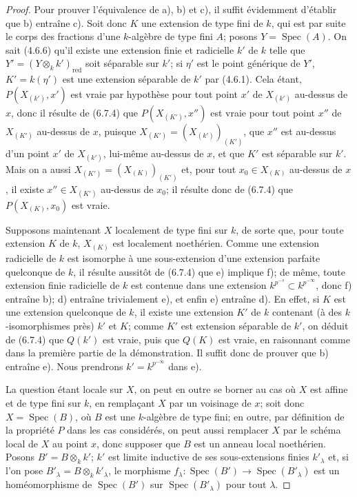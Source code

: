 \begin{proof}
Pour prouver l'équivalence de a), b) et c), il suffit évidemment d'établir
que b) entraîne c). Soit donc $K$ une extension de type fini de $k$, qui est
par suite le corps des fractions d'une $k$-algèbre de type fini $A$; posons
$Y=\operatorname{Spec}(A)$. On sait (4.6.6) qu'il existe une extension finie
et radicielle $k'$ de $k$ telle que $Y'=(Y\otimes_k k')_{\mathrm{red}}$ soit
séparable sur $k'$; si $\eta'$ est le point générique de $Y'$, $K'=k(\eta')$
est une extension séparable de $k'$ par (4.6.1). Cela étant,
$P(X_{(k')},x')$ est vraie par hypothèse pour tout point $x'$ de $X_{(k')}$
au-dessus de $x$, donc il résulte de (6.7.4) que $P(X_{(K')},x'')$ est vraie
pour tout point $x''$ de $X_{(K')}$ au-dessus de $x$, puisque
$X_{(K')}=(X_{(k')})_{(K')}$, que $x''$ est au-dessus d'un point $x'$ de
$X_{(k')}$, lui-même au-dessus de $x$, et que $K'$ est séparable sur $k'$.
Mais on a aussi
$X_{(K')}=(X_{(K)})_{(K')}$ et, pour tout $x_0\in X_{(K)}$ au-dessus de
$x$, il existe $x''\in X_{(K')}$ au-dessus de $x_0$; il résulte donc de
(6.7.4) que $P(X_{(K)},x_0)$ est vraie.

Supposons maintenant $X$ localement de type fini sur $k$, de sorte que, pour
toute extension $K$ de $k$, $X_{(K)}$ est localement noethérien. Comme une
extension radicielle de $k$ est isomorphe à une sous-extension d'une extension
parfaite quelconque de $k$, il résulte aussitôt de (6.7.4) que e) implique f);
de même, toute extension finie radicielle de $k$ est contenue dans une
extension $k^{p^{-s}}\subset k^{p^{-\infty}}$, donc f) entraîne b); d) entraîne
trivialement e), et enfin e) entraîne d). En effet, si $K$ est une extension
quelconque de $k$,
il existe une extension $K'$ de $k$ contenant (à des $k$-isomorphismes près)
$k'$ et $K$; comme $K'$ est extension séparable de $k'$, on déduit de (6.7.4)
que $Q(k')$ est vraie, puis que $Q(K)$ est vraie, en raisonnant comme dans la
première partie de la démonstration. Il suffit donc de prouver que b) entraîne
e). Nous prendrons $k'=k^{p^{-\infty}}$ dans e).

La question étant locale sur $X$, on peut en outre se borner au cas où $X$
est affine et de type fini sur $k$, en remplaçant $X$ par un voisinage de $x$;
soit donc $X=\operatorname{Spec}(B)$, où $B$ est une $k$-algèbre de type fini;
en outre, par définition de la propriété $P$ dans les cas considérés, on peut
aussi remplacer $X$ par le schéma local de $X$ au point $x$, donc supposer que
$B$ est un anneau local noethérien. Posons $B'=B\otimes_k k'$; $k'$ est
limite inductive de ses sous-extensions finies $k'_\lambda$ et, si l'on pose
$B'_\lambda=B\otimes_k k'_\lambda$, le morphisme
$f_\lambda:\operatorname{Spec}(B')\to\operatorname{Spec}(B'_\lambda)$ est
un homéomorphisme de $\operatorname{Spec}(B')$ sur
$\operatorname{Spec}(B'_\lambda)$ pour tout $\lambda$.


\end{proof}
